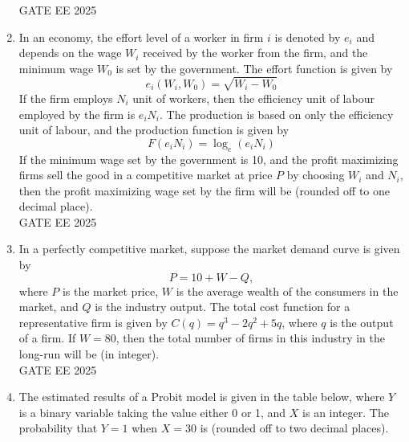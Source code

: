 \documentclass[journal,12pt,onecolumn]{IEEEtran}
\theoremstyle{remark}
\begin{document}
\begin{enumerate}
\begin{center}
\begin{tabular}{|l|c|c|c|}
\hline
\end{tabular}
\end{center}
GATE EE 2025\\
\item In an economy, the effort level of a worker in firm $i$ is denoted by $e_i$ and depends on the wage $W_i$ received by the worker from the firm, and the minimum wage $W_0$ is set by the government. The effort function is given by 
\[
e_i(W_i, W_0) = \sqrt{W_i - W_0}
\]
If the firm employs $N_i$ unit of workers, then the efficiency unit of labour employed by the firm is $e_i N_i$. The production is based on only the efficiency unit of labour, and the production function is given by
\[
F(e_i N_i) = \log_e (e_i N_i)
\]
If the minimum wage set by the government is 10, and the profit maximizing firms sell the good in a competitive market at price $P$ by choosing $W_i$ and $N_i$, then the profit maximizing wage set by the firm will be \underline{\hspace{2cm}} (rounded off to one decimal place).\\
GATE EE 2025\\
\item In a perfectly competitive market, suppose the market demand curve is given by 
\[
P = 10 + W - Q,
\]
where $P$ is the market price, $W$ is the average wealth of the consumers in the market, and $Q$ is the industry output. The total cost function for a representative firm is given by $C(q) = q^3 - 2q^2 + 5q$, where $q$ is the output of a firm. If $W = 80$, then the total number of firms in this industry in the long-run will be \underline{\hspace{2cm}} (in integer).
\\
GATE EE 2025\\
\item The estimated results of a Probit model is given in the table below, where $Y$ is a binary variable taking the value either 0 or 1, and $X$ is an integer. The probability that $Y = 1$ when $X = 30$ is \underline{\hspace{2cm}} (rounded off to two decimal places).


\end{enumerate}
\end{document}
